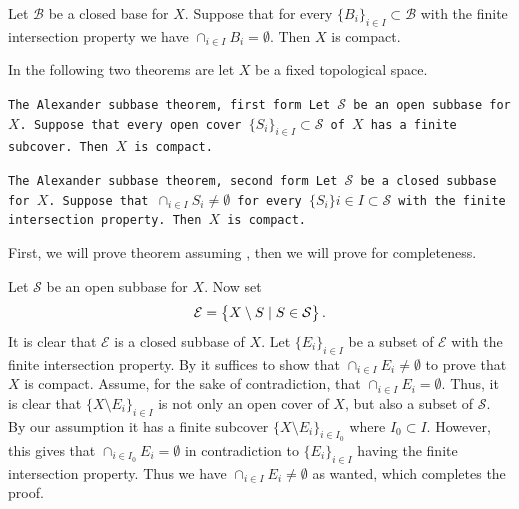 \documentclass[11pt,a4paper]{article}
\begin{document}
\begin{proposition}\label{prp:alexander}
  Let $\mathcal{B}$ be a closed base for $X$. Suppose that for every 
  $\{B_i\}_{i \in I} \subset \mathcal{B}$ with the finite intersection 
  property we have $\cap_{i \in I}{B_i} = \emptyset$. Then $X$ is 
  compact.
\end{proposition}

In the following two theorems are let $X$ be a fixed topological space.

\begin{theorem}\label{thm:alexander-first}
  \tt{The Alexander subbase theorem, first form}
  Let $\mathcal{S}$ be an open subbase for $X$. Suppose that every 
  open cover $\{S_i\}_{i \in I} \subset \mathcal{S}$ of $X$ has a 
  finite subcover. Then $X$ is compact.
\end{theorem}

\begin{theorem}\label{thm:alexander-second}
  \tt{The Alexander subbase theorem, second form}
  Let $\mathcal{S}$ be a closed subbase for $X$. Suppose that 
  $\cap_{i \in I}{S_i} \neq \emptyset$ for every 
  $\{S_i\}{i \in I} \subset \mathcal{S}$ with the finite intersection 
  property. Then $X$ is compact.
\end{theorem}

\begin{remark}
  First, we will prove theorem  assuming
  , then we will prove 
   for completeness.
\end{remark}

\begin{proofof}{}
  Let $\mathcal S$ be an open subbase for $X$. Now set
  \[
    \mathcal E = \left\{X \setminus S \mid S \in \mathcal S\right\}.
  \]
  It is clear that $\mathcal E$ is a closed subbase of $X$.
  Let $\{E_i\}_{i \in I}$ be a subset of $\mathcal E$ with the finite
  intersection property.
  By  it suffices to show that
  $\cap_{i \in I}{E_i} \neq \emptyset$ to prove that $X$ is compact.
  Assume, for the sake of contradiction, 
  that $\cap_{i \in I}{E_i} = \emptyset$.
  Thus, it is clear that $\{X \setminus E_i\}_{i \in I}$ is not only an
  open cover of $X$, but also a subset of $\mathcal S$. By our assumption
  it has a finite subcover $\{X \setminus E_i\}_{i \in I_0}$
  where $I_0 \subset I$. However, this gives that
  $\cap_{i \in I_0} E_i = \emptyset$ in contradiction to $\{E_i\}_{i \in I}$
  having the finite intersection property.
  Thus we have $\cap_{i \in I}{E_i} \neq \emptyset$ as wanted, which
  completes the proof.
\end{proofof}
\end{document}
